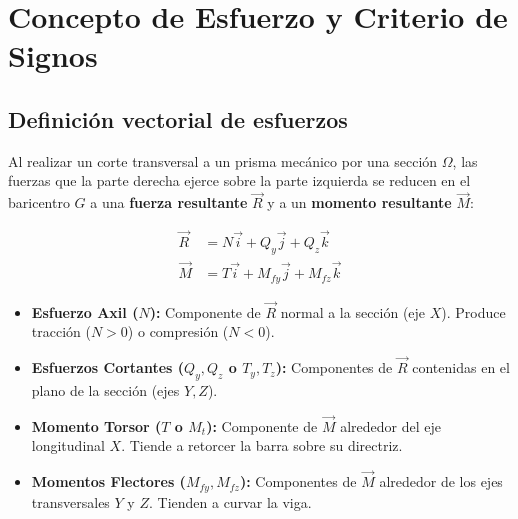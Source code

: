 
\section{Concepto de Esfuerzo y Criterio de Signos}



\subsection{Definición vectorial de esfuerzos}

Al realizar un corte transversal a un prisma mecánico por una sección $\Omega$, las fuerzas que la parte derecha ejerce sobre la parte izquierda se reducen en el baricentro $G$ a una \textbf{fuerza resultante} $\vec{R}$ y a un \textbf{momento resultante} $\vec{M}$:




\begin{align}

    \vec{R} & = N\vec{i} + Q_y\vec{j} + Q_z\vec{k}       \\

    \vec{M} & = T\vec{i} + M_{fy}\vec{j} + M_{fz}\vec{k}

\end{align}



\begin{itemize}

    \item \textbf{Esfuerzo Axil ($N$):} Componente de $\vec{R}$ normal a la sección (eje $X$). Produce tracción ($N > 0$) o compresión ($N < 0$).

    \item \textbf{Esfuerzos Cortantes ($Q_y, Q_z$ o $T_y, T_z$):} Componentes de $\vec{R}$ contenidas en el plano de la sección (ejes $Y, Z$).

    \item \textbf{Momento Torsor ($T$ o $M_t$):} Componente de $\vec{M}$ alrededor del eje longitudinal $X$. Tiende a retorcer la barra sobre su directriz.

    \item \textbf{Momentos Flectores ($M_{fy}, M_{fz}$):} Componentes de $\vec{M}$ alrededor de los ejes transversales $Y$ y $Z$. Tienden a curvar la viga.

\end{itemize}

